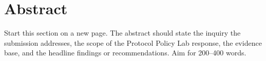 
%
%

%
%

\section{Abstract}

\begin{instructional}
Start this section on a new page. The abstract should state the inquiry the submission addresses, the scope of the Protocol Policy Lab response, the evidence base, and the headline findings or recommendations. Aim for 200--400 words.
\end{instructional}

%
